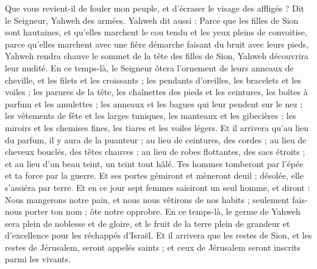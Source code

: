 \begin{multicols}{2}
Que vous revient-il de fouler mon peuple, et d'écraser le visage des affligés ? Dit le Seigneur, Yahweh des armées.
Yahweh dit aussi : Parce que les filles de Sion sont hautaines, et qu'elles marchent le cou tendu et les yeux pleins de convoitise, parce qu'elles marchent avec une fière démarche faisant du bruit avec leurs pieds,
Yahweh rendra chauve le sommet de la tête des filles de Sion, Yahweh découvrira leur nudité.
En ce temps-là, le Seigneur ôtera l'ornement de leurs anneaux de cheville, et les filets et les croissants ;
les pendants d'oreilles, les bracelets et les voiles ;
les parures de la tête, les chaînettes des pieds et les ceintures, les boîtes à parfum et les amulettes ;
les anneaux et les bagues qui leur pendent sur le nez ;
les vêtements de fête et les larges tuniques, les manteaux et les gibecières ;
les miroirs et les chemises fines, les tiares et les voiles légers.
Et il arrivera qu'au lieu du parfum, il y aura de la puanteur ; au lieu de ceintures, des cordes ; au lieu de cheveux bouclés, des têtes chauves ; au lieu de robes flottantes, des sacs étroits ; et au lieu d'un beau teint, un teint tout hâlé.
Tes hommes tomberont par l'épée et ta force par la guerre.
Et ses portes gémiront et mèneront deuil ; désolée, elle s'assiéra par terre.
\VerseOne{}Et en ce jour sept femmes saisiront un seul homme, et diront : Nous mangerons notre pain, et nous nous vêtirons de nos habits ; seulement fais-nous porter ton nom ; ôte notre opprobre.
En ce temps-là, le germe de Yahweh sera plein de noblesse et de gloire, et le fruit de la terre plein de grandeur et d'excellence pour les réchappés d'Israël.
Et il arrivera que les restes de Sion, et les restes de Jérusalem, seront appelés saints ; et ceux de Jérusalem seront inscrits parmi les vivants.

\end{multicols}
